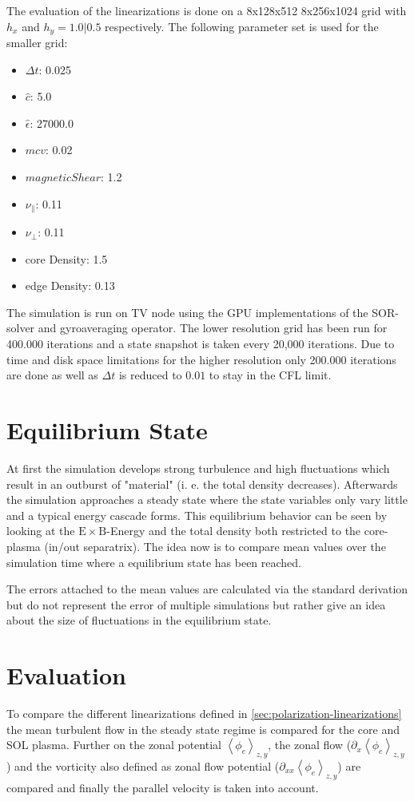 \documentclass[master.tex]{subfiles}
\newcommand{\meanxy}[1]{\left<#1\right>_{z,y}}
\begin{document}
The evaluation of the linearizations is done on a 8x128x512 8x256x1024 grid with $h_x$ and $h_y=1.0|0.5$ respectively. The following parameter set is used for the smaller grid:
\begin{itemize}
    \item $\Delta t$: 0.025
    \item $\hat{c}$: 5.0
    \item $\hat{\epsilon}$: 27000.0
    \item $mcv$: 0.02
    \item $magnetic Shear$: 1.2
    \item $\nu_{\parallel}$: 0.11
    \item $\nu_{\perp}$: 0.11
    \item core Density: 1.5
    \item edge Density: 0.13
\end{itemize}
The simulation is run on \ac{TV} node using the GPU implementations of the \ac{SOR}-solver and gyroaveraging operator. The lower resolution grid has been run for 400.000 iterations and a state snapshot is taken every 20,000 iterations. Due to time and disk space limitations for the higher resolution only 200.000 iterations are done as well as $\Delta t$ is reduced to $0.01$ to stay in the \ac{CFL} limit.

\section{Equilibrium State}
At first the simulation develops strong turbulence and high fluctuations which result in an outburst of "material" (i. e. the total density decreases). Afterwards the simulation approaches a steady state where the state variables only vary little and a typical energy cascade forms. This equilibrium behavior can be seen by looking at the $\mathrm{E} \times \mathrm{B}$-Energy and the total density both restricted to the core-plasma (in/out separatrix). The idea now is to compare mean values over the simulation time where a equilibrium state has been reached. 

\begin{blockquote}
    The errors attached to the mean values are calculated via the standard derivation but do not represent the error of multiple simulations but rather give an idea about the size of fluctuations in the equilibrium state.
\end{blockquote}
    
\section{Evaluation}
To compare the different linearizations defined in \autoref{sec:polarization-linearizations} the mean turbulent flow in the steady state regime is compared for the core and \ac{SOL} plasma. Further on the zonal potential  $\meanxy{\phi_e}$, the zonal flow ($\partial_x \meanxy{\phi_e}$) and the vorticity also defined as zonal flow potential ($\partial_{xx}\meanxy{\phi_e}$) are compared and finally the parallel velocity is taken into account.
\end{document}
